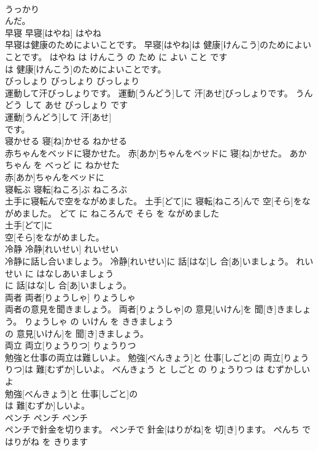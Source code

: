 \documentclass[8pt]{extreport}
\begin{document}
\begin{CJK}{UTF8}{min}
\\	うっかり
\\	んだ。			
\\	早寝	早寝[はやね]	はやね	
\\	早寝は健康のためによいことです。	早寝[はやね]は 健康[けんこう]のためによいことです。	はやね は けんこう の ため に よい こと です	
\\	は 健康[けんこう]のためによいことです。			
\\	びっしょり	びっしょり	びっしょり	
\\	運動して汗びっしょりです。	運動[うんどう]して 汗[あせ]びっしょりです。	うんどう して あせ びっしょり です	
\\	運動[うんどう]して 汗[あせ]
\\	です。			
\\	寝かせる	寝[ね]かせる	ねかせる	
\\	赤ちゃんをベッドに寝かせた。	赤[あか]ちゃんをベッドに 寝[ね]かせた。	あかちゃん を べっど に ねかせた	
\\	赤[あか]ちゃんをベッドに
\\	寝転ぶ	寝転[ねころ]ぶ	ねころぶ	
\\	土手に寝転んで空をながめました。	土手[どて]に 寝転[ねころ]んで 空[そら]をながめました。	どて に ねころんで そら を ながめました	
\\	土手[どて]に
\\	空[そら]をながめました。			
\\	冷静	冷静[れいせい]	れいせい	
\\	冷静に話し合いましょう。	冷静[れいせい]に 話[はな]し 合[あ]いましょう。	れいせい に はなしあいましょう	
\\	に 話[はな]し 合[あ]いましょう。			
\\	両者	両者[りょうしゃ]	りょうしゃ	
\\	両者の意見を聞きましょう。	両者[りょうしゃ]の 意見[いけん]を 聞[き]きましょう。	りょうしゃ の いけん を ききましょう	
\\	の 意見[いけん]を 聞[き]きましょう。			
\\	両立	両立[りょうりつ]	りょうりつ	
\\	勉強と仕事の両立は難しいよ。	勉強[べんきょう]と 仕事[しごと]の 両立[りょうりつ]は 難[むずか]しいよ。	べんきょう と しごと の りょうりつ は むずかしい よ	
\\	勉強[べんきょう]と 仕事[しごと]の
\\	は 難[むずか]しいよ。			
\\	ペンチ	ペンチ	ペンチ	
\\	ペンチで針金を切ります。	ペンチで 針金[はりがね]を 切[き]ります。	ぺんち で はりがね を きります	

\end{CJK}
\end{document}
